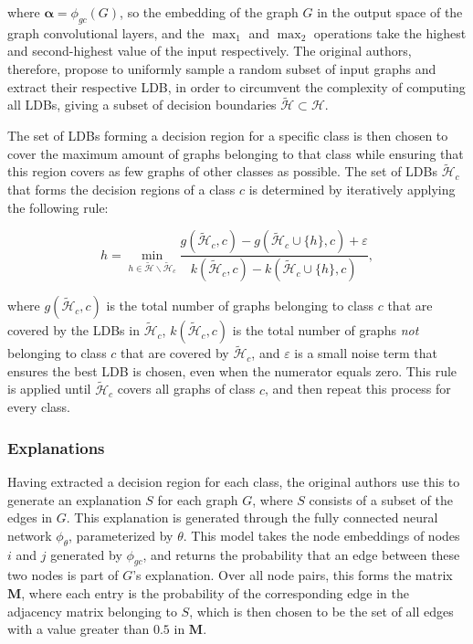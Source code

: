 where $\boldsymbol{\alpha} = \phi_{gc}(G)$, so the embedding of the graph $G$ in the output space of the graph convolutional layers, and the $\max_{1}$ and $\max_{2}$ operations take the highest and second-highest value of the input respectively. The original authors, therefore, propose to uniformly sample a random subset of input graphs and extract their respective LDB, in order to circumvent the complexity of computing all LDBs, giving a subset of decision boundaries $\tilde{\mathcal{H}} \subset \mathcal{H}$. 

The set of LDBs forming a decision region for a specific class is then chosen to cover the maximum amount of graphs belonging to that class while ensuring that this region covers as few graphs of other classes as possible. 
The set of LDBs $\tilde{\mathcal{H}}_{c}$ that forms the decision regions of a class $c$ is determined by iteratively applying the following rule:

\begin{equation}
    h = \min_{h \in \tilde{\mathcal{H}} \backslash \tilde{\mathcal{H}}_{c}} \frac{g(\tilde{\mathcal{H}}_{c}, c) - g(\tilde{\mathcal{H}}_{c} \cup \{h\}, c) + \varepsilon}{k(\tilde{\mathcal{H}}_{c}, c) - k(\tilde{\mathcal{H}}_{c} \cup \{h\}, c)},
\end{equation}

where $g(\tilde{\mathcal{H}}_{c}, c)$ is the total number of graphs belonging to class $c$ that are covered by the LDBs in $\tilde{\mathcal{H}}_{c}$, $k(\tilde{\mathcal{H}}_{c}, c)$ is the total number of graphs \textit{not} belonging to class $c$ that are covered by $\tilde{\mathcal{H}}_{c}$, and $\varepsilon$ is a small noise term that ensures the best LDB is chosen, even when the numerator equals zero. This rule is applied until $\tilde{\mathcal{H}}_{c}$ covers all graphs of class $c$, and then repeat this process for every class.

\subsubsection{Explanations}

Having extracted a decision region for each class, the original authors use this to generate an explanation $S$ for each graph $G$, where $S$ consists of a subset of the edges in $G$. This explanation is generated through the fully connected neural network $\phi_{\theta}$, parameterized by $\theta$. This model takes the node embeddings of nodes $i$ and $j$ generated by $\phi_{gc}$, and returns the probability that an edge between these two nodes is part of $G$'s explanation. Over all node pairs, this forms the matrix $\textbf{M}$, where each entry is the probability of the corresponding edge in the adjacency matrix belonging to $S$, which is then chosen to be the set of all edges with a value greater than $0.5$ in $\textbf{M}$.

